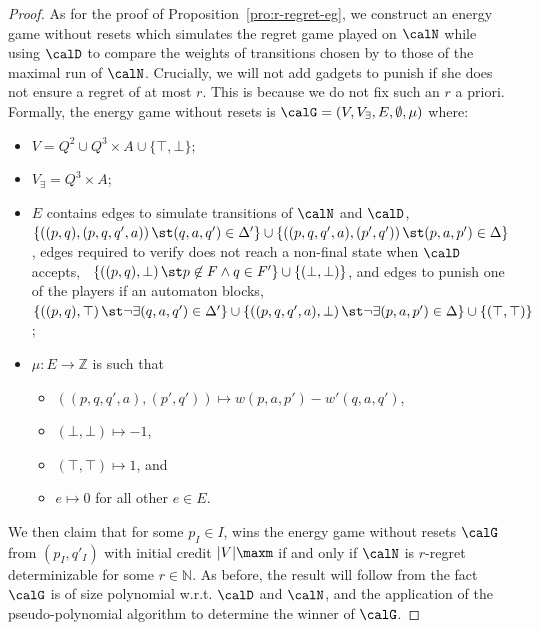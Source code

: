 \documentclass[a4paper]{article}
\begin{document}
\begin{proof}
	As for the proof of Proposition~\ref{pro:r-regret-eg}, we
	construct an energy game without resets
	which simulates the regret game played on $\calN$
	while using $\calD$ to compare the weights of transitions chosen by \eve
	to those of the maximal run of $\calN$. Crucially, we will not add
	gadgets to punish \eve if she does not ensure a regret of at most $r$.
	This is because we do not fix such an $r$ a priori.
	Formally, the energy
	game without resets is $\calG = (V,V_\exists,E, \emptyset,\mu)$ where:
	\begin{itemize}[nolistsep]
		\item $V = Q^2 \cup Q^3 \times A \cup \{\top,\bot\}$;
		\item $V_\exists =  Q^3 \times A$;
		\item $E$ contains edges to simulate transitions of $\calN$
			and $\calD$, \ie 
			$\{ \left((p,q),(p,q,q',a)\right) \st (q,a,q') \in
			\Delta' \} \cup \{ \left((p,q,q',a),(p',q')\right) \st
			(p,a,p') \in \Delta \}$, edges required
			to verify \eve does not reach a non-final state when
			$\calD$ accepts, \ie~$\{ \left((p,q),\bot\right) \st p
			\not\in F \land q \in F' \} \cup \{ (\bot,\bot) \}$,
			and edges to punish one of the
			players if an automaton blocks, \ie~$\{ \left( (p,q), \top
			\right) \st \lnot \exists (q,a,q') \in \Delta'\} \cup
			\{ \left( (p,q,q',a), \bot \right) \st \lnot \exists
			(p,a,p') \in \Delta\} \cup \{(\top,\top)\}$;
		\item $\mu : E \to \mathbb{Z}$ is such that
			\begin{itemize}[nolistsep]
				\item $\left( (p,q,q',a),(p',q') \right) \mapsto
					w(p,a,p') - w'(q,a,q')$,
				\item $(\bot,\bot) \mapsto -1$,
				\item $(\top,\top) \mapsto 1$, and
				\item $e \mapsto 0$ for all other $e \in E$.
			\end{itemize}
	\end{itemize}
	We then claim that for some $p_I \in I$, \eve wins the energy game
	without resets $\calG$ from $(p_I,q'_I)$ with initial credit 
	$|V|\maxm$ if and only if $\calN$ is $r$-regret
	determinizable for some $r \in \mathbb{N}$.
	As before, the result will follow from the fact $\calG$ is of size
	polynomial w.r.t. $\calD$ and $\calN$, and the application of the
	pseudo-polynomial algorithm to determine the winner of $\calG$.


\end{proof}
\end{document}
